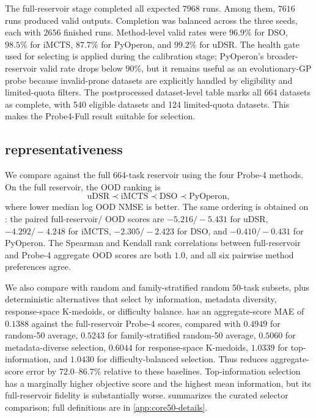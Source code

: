 The \probe{} full-reservoir stage completed all expected $7968$ runs. Among them, $7616$ runs produced valid outputs. Completion was balanced across the three seeds, each with $2656$ finished runs. Method-level valid rates were $96.9\%$ for DSO, $98.5\%$ for iMCTS, $87.7\%$ for PyOperon, and $99.2\%$ for uDSR. The health gate used for selecting \probe{} is applied during the \candidate{} calibration stage; PyOperon's broader-reservoir valid rate drops below $90\%$, but it remains useful as an evolutionary-GP probe because invalid-prone datasets are explicitly handled by eligibility and limited-quota filters. The postprocessed dataset-level table marks all 664 datasets as complete, with 540 eligible datasets and 124 limited-quota datasets. This makes the Probe4-Full result suitable for \core{} selection.

\subsection{\core{} representativeness}

We compare \core{} against the full 664-task reservoir using the four Probe-4 methods. On the full reservoir, the OOD ranking is
\[
\mathrm{uDSR} \prec \mathrm{iMCTS} \prec \mathrm{DSO} \prec \mathrm{PyOperon},
\]
where lower median log OOD NMSE is better. The same ordering is obtained on \core{}: the paired full-reservoir/\core{} OOD scores are $-5.216/-5.431$ for uDSR, $-4.292/-4.248$ for iMCTS, $-2.305/-2.423$ for DSO, and $-0.410/-0.431$ for PyOperon. The Spearman and Kendall rank correlations between full-reservoir and \core{} Probe-4 aggregate OOD scores are both $1.0$, and all six pairwise method preferences agree.

We also compare \core{} with random and family-stratified random 50-task subsets, plus deterministic alternatives that select by information, metadata diversity, response-space K-medoids, or difficulty balance. \core{} has an aggregate-score MAE of $0.1388$ against the full-reservoir Probe-4 scores, compared with $0.4949$ for random-50 average, $0.5243$ for family-stratified random-50 average, $0.5060$ for metadata-diverse selection, $0.6044$ for response-space K-medoids, $1.0339$ for top-information, and $1.0430$ for difficulty-balanced selection. Thus \core{} reduces aggregate-score error by $72.0$--$86.7\%$ relative to these baselines. Top-information selection has a marginally higher objective score and the highest mean information, but its full-reservoir fidelity is substantially worse.  summarizes the curated selector comparison; full definitions are in \cref{app:core50-details}.

